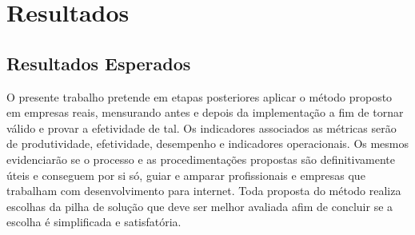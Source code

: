 \chapter{Resultados}\label{sec:resultados}
\section{Resultados Esperados}
O presente trabalho pretende em etapas posteriores aplicar o método proposto em empresas reais, mensurando antes e depois da implementação a fim de tornar válido e provar a efetividade de tal. Os indicadores associados as métricas serão de produtividade, efetividade, desempenho e indicadores operacionais. Os mesmos evidenciarão se o processo e as procedimentações propostas são definitivamente úteis e conseguem por si só, guiar e amparar profissionais e empresas que trabalham com desenvolvimento para internet. Toda proposta do método realiza escolhas da pilha de solução que deve ser melhor avaliada afim de concluir se a escolha é simplificada e satisfatória.